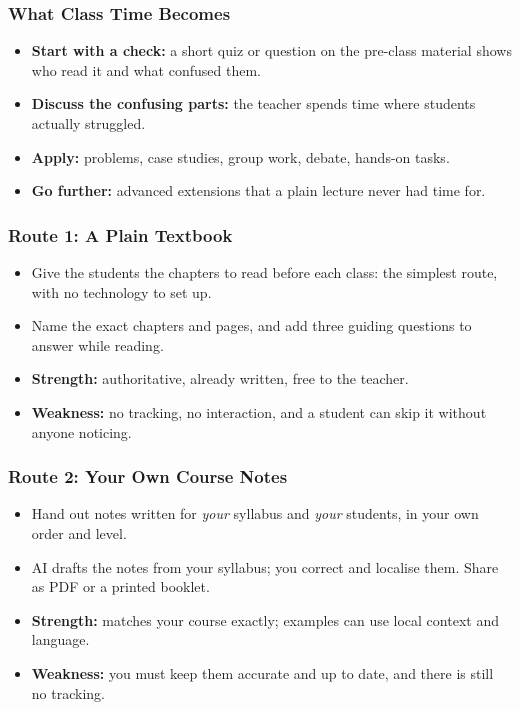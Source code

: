 \begin{frame}[fragile]\frametitle{What Class Time Becomes}
\begin{itemize}
\item \textbf{Start with a check:} a short quiz or question on the pre-class material shows who read it and what confused them.
\item \textbf{Discuss the confusing parts:} the teacher spends time where students actually struggled.
\item \textbf{Apply:} problems, case studies, group work, debate, hands-on tasks.
\item \textbf{Go further:} advanced extensions that a plain lecture never had time for.
\end{itemize}
\end{frame}

\begin{frame}[fragile]\frametitle{Route 1: A Plain Textbook}
\begin{itemize}
\item Give the students the chapters to read before each class: the simplest route, with no technology to set up.
\item Name the exact chapters and pages, and add three guiding questions to answer while reading.
\item \textbf{Strength:} authoritative, already written, free to the teacher.
\item \textbf{Weakness:} no tracking, no interaction, and a student can skip it without anyone noticing.
\end{itemize}
\end{frame}

\begin{frame}[fragile]\frametitle{Route 2: Your Own Course Notes}
\begin{itemize}
\item Hand out notes written for \emph{your} syllabus and \emph{your} students, in your own order and level.
\item AI drafts the notes from your syllabus; you correct and localise them. Share as PDF or a printed booklet.
\item \textbf{Strength:} matches your course exactly; examples can use local context and language.
\item \textbf{Weakness:} you must keep them accurate and up to date, and there is still no tracking.
\end{itemize}
\end{frame}

